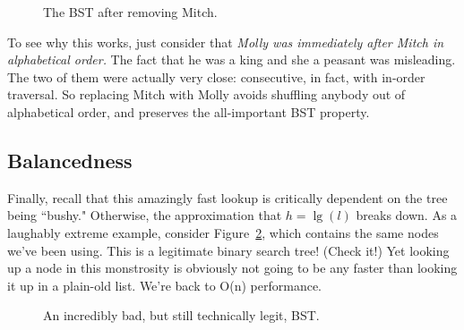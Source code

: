 \begin{figure}[ht]
\centering
\begin{custommargins}{-2.1cm}{-3cm}
\caption{The BST after removing Mitch.}
\label{bstremoveright2}
\end{custommargins}
\end{figure}

To see why this works, just consider that \textit{Molly was immediately
after Mitch in alphabetical order.} The fact that he was a king and she a
peasant was misleading. The two of them were actually very close:
consecutive, in fact, with in-order traversal. So replacing Mitch with
Molly avoids shuffling anybody out of alphabetical order, and preserves the
all-important BST property.

\subsection{Balancedness}

Finally, recall that this amazingly fast lookup is critically dependent on
the tree being ``bushy." Otherwise, the approximation that $h=\lg(l)$
breaks down. As a laughably extreme example, consider
Figure~\ref{bstunbalanced}, which contains the same nodes we've been using.
This is a legitimate binary search tree! (Check it!) Yet looking up a node
in this monstrosity is obviously not going to be any faster than looking it
up in a plain-old list. We're back to O(n) performance.

\begin{figure}[ht]
\centering
{}
\caption{An incredibly bad, but still technically legit, BST.}
\label{bstunbalanced}
\end{figure}

